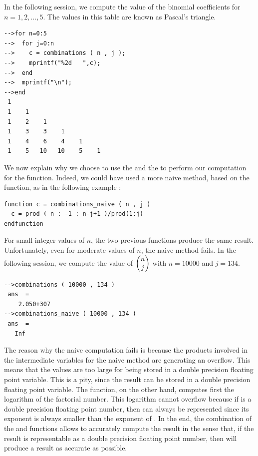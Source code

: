 In the following session, we compute the value of the binomial 
coefficients for $n=1,2,\ldots,5$. The values in this table 
are known as Pascal's triangle.
\lstset{language=scilabscript}
\begin{lstlisting}
-->for n=0:5
-->  for j=0:n
-->    c = combinations ( n , j );
-->    mprintf("%2d   ",c);
-->  end
-->  mprintf("\n");
-->end
 1   
 1    1   
 1    2    1   
 1    3    3    1   
 1    4    6    4    1   
 1    5   10   10    5    1   
\end{lstlisting}

We now explain why we choose to use the  and the 
 to perform our computation for the 
function. Indeed, we could have used a more naive method, based on the 
 function, as in the following example :
\lstset{language=scilabscript}
\begin{lstlisting}
function c = combinations_naive ( n , j )
  c = prod ( n : -1 : n-j+1 )/prod(1:j)
endfunction
\end{lstlisting}

For small integer values of $n$, the two previous functions 
produce the same result. Unfortunately, even for moderate 
values of $n$, the naive method fails. In the following session, we 
compute the value of $\choosefun{n}{j}$ with $n=10000$ and 
$j=134$.
\lstset{language=scilabscript}
\begin{lstlisting}
-->combinations ( 10000 , 134 )
 ans  =
    2.050+307  
-->combinations_naive ( 10000 , 134 )
 ans  =
   Inf  
\end{lstlisting}

The reason why the naive computation fails is because the products 
involved in the intermediate variables for the naive method are 
generating an overflow. This means that the values are too large 
for being stored in a double precision floating point variable.
This is a pity, since the result can be stored in a double precision
floating point variable. The  function, on the 
other hand, computes first the logarithm of the factorial number. This 
logarithm cannot overflow because if  is a double precision 
floating point number, then  can always be 
represented since its exponent is always smaller than the exponent 
of . In the end, the combination of the 
and  functions allows to accurately compute the 
result in the sense that, if the result is representable as 
a double precision floating point number, then 
will produce a result as accurate as possible.

